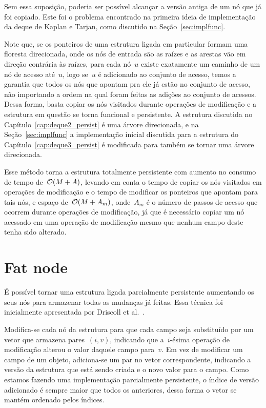 \documentclass[main.tex]{subfiles}
\begin{document}
Sem essa suposição, poderia ser possível alcançar a versão antiga de um nó que já foi copiado. Este foi o problema encontrado na primeira ideia de implementação da deque de Kaplan e Tarjan, como discutido na Seção~\ref{sec:implfunc}.

Note que, se os ponteiros de uma estrutura ligada em particular formam uma floresta direcionada, onde os nós de entrada são as raízes e as arestas vão em direção contrária às raízes, para cada nó~$u$ existe exatamente um caminho de um nó de acesso até~$u$, logo se~$u$ é adicionado ao conjunto de acesso, temos a garantia que todos os nós que apontam pra ele já estão no conjunto de acesso, não importando a ordem na qual foram feitas as adições ao conjunto de acessos. Dessa forma, basta copiar os nós visitados durante operações de modificação e a estrutura em questão se torna funcional e persistente. A estrutura discutida no Capítulo~\ref{cap:deque2_persist} é uma árvore direcionada, e na Seção~\ref{sec:implfunc} a implementação inicial discutida para a estrutura do Capítulo~\ref{cap:deque3_persist} é modificada para também se tornar uma árvore direcionada.

Esse método torna a estrutura totalmente persistente com aumento no consumo de tempo de~$\mathcal{O}(M+A)$, levando em conta o tempo de copiar os nós visitados em operações de modificação e o tempo de modificar os ponteiros que apontam para tais nós, e espaço de~$\mathcal{O}(M+A_m)$, onde~$A_m$ é o número de passos de acesso que ocorrem durante operações de modificação, já que é necessário copiar um nó acessado em uma operação de modificação mesmo que nenhum campo deste tenha sido alterado.

\section{Fat node}

É possível tornar uma estrutura ligada parcialmente persistente aumentando os seus nós para armazenar todas as mudanças já feitas. Essa técnica foi inicialmente apresentada por Driscoll et al.~\cite{DriscollSST1989}.

Modifica-se cada nó da estrutura para que cada campo seja substituído por um vetor que armazena pares~$(i, v)$, indicando que a~$i$-ésima operação de modificação alterou o valor daquele campo para~$v$. Em vez de modificar um campo de um objeto, adiciona-se um par no vetor correspondente, indicando a versão da estrutura que está sendo criada e o novo valor para o campo. Como estamos fazendo uma implementação parcialmente persistente, o índice de versão adicionado é sempre maior que todos os anteriores, dessa forma o vetor se mantém ordenado pelos índices.
\end{document}
